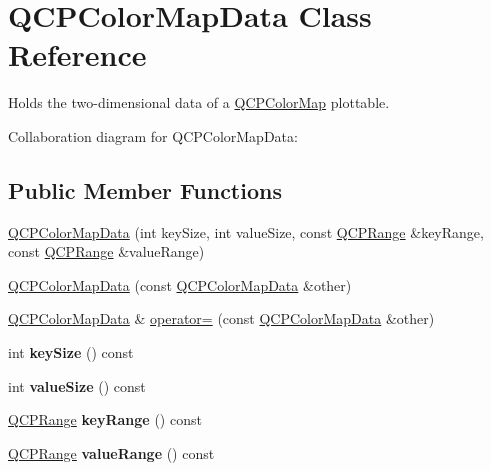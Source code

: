 \hypertarget{classQCPColorMapData}{}\section{Q\+C\+P\+Color\+Map\+Data Class Reference}
\label{classQCPColorMapData}


Holds the two-\/dimensional data of a \hyperlink{classQCPColorMap}{Q\+C\+P\+Color\+Map} plottable.  




Collaboration diagram for Q\+C\+P\+Color\+Map\+Data\+:
\subsection*{Public Member Functions}
\begin{DoxyCompactItemize}
\item 
\hyperlink{classQCPColorMapData_aac9d8eb81e18e240d89d56c01933fd23}{Q\+C\+P\+Color\+Map\+Data} (int key\+Size, int value\+Size, const \hyperlink{classQCPRange}{Q\+C\+P\+Range} \&key\+Range, const \hyperlink{classQCPRange}{Q\+C\+P\+Range} \&value\+Range)
\item 
\hyperlink{classQCPColorMapData_a7f2145d86473263494abb9bf1de20436}{Q\+C\+P\+Color\+Map\+Data} (const \hyperlink{classQCPColorMapData}{Q\+C\+P\+Color\+Map\+Data} \&other)
\item 
\hyperlink{classQCPColorMapData}{Q\+C\+P\+Color\+Map\+Data} \& \hyperlink{classQCPColorMapData_afdf4dd1b2f5714234fe84709b85c2a8d}{operator=} (const \hyperlink{classQCPColorMapData}{Q\+C\+P\+Color\+Map\+Data} \&other)
\item 
int {\bfseries key\+Size} () const \hypertarget{classQCPColorMapData_aa8d7811686fdfea964947715210c4af8}{}\label{classQCPColorMapData_aa8d7811686fdfea964947715210c4af8}

\item 
int {\bfseries value\+Size} () const \hypertarget{classQCPColorMapData_ab880be6bc587f34e8d22fe77ef6b57e9}{}\label{classQCPColorMapData_ab880be6bc587f34e8d22fe77ef6b57e9}

\item 
\hyperlink{classQCPRange}{Q\+C\+P\+Range} {\bfseries key\+Range} () const \hypertarget{classQCPColorMapData_a4765180639742460f64ab6c97c745c08}{}\label{classQCPColorMapData_a4765180639742460f64ab6c97c745c08}

\item 
\hyperlink{classQCPRange}{Q\+C\+P\+Range} {\bfseries value\+Range} () const \hypertarget{classQCPColorMapData_a025be4d7ba0494fd7b38a5a56c737f2a}{}\label{classQCPColorMapData_a025be4d7ba0494fd7b38a5a56c737f2a}


\end{DoxyCompactItemize}
